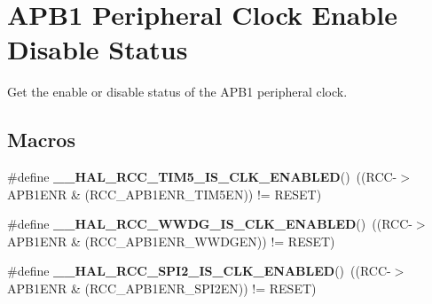 \hypertarget{group___r_c_c___a_p_b1___peripheral___clock___enable___disable___status}{}\section{A\+P\+B1 Peripheral Clock Enable Disable Status}
\label{group___r_c_c___a_p_b1___peripheral___clock___enable___disable___status}


Get the enable or disable status of the A\+P\+B1 peripheral clock.  


\subsection*{Macros}
\begin{DoxyCompactItemize}
\item 
\mbox{\label{group___r_c_c___a_p_b1___peripheral___clock___enable___disable___status_ga76f0a16fed0812fbab8bf15621939c8b}} 
\#define {\bfseries \+\_\+\+\_\+\+H\+A\+L\+\_\+\+R\+C\+C\+\_\+\+T\+I\+M5\+\_\+\+I\+S\+\_\+\+C\+L\+K\+\_\+\+E\+N\+A\+B\+L\+ED}()~((R\+CC-\/$>$A\+P\+B1\+E\+NR \& (R\+C\+C\+\_\+\+A\+P\+B1\+E\+N\+R\+\_\+\+T\+I\+M5\+EN)) != R\+E\+S\+ET)
\item 
\mbox{\label{group___r_c_c___a_p_b1___peripheral___clock___enable___disable___status_ga9b26aff2638d1e0613b0ce0530f0cd48}} 
\#define {\bfseries \+\_\+\+\_\+\+H\+A\+L\+\_\+\+R\+C\+C\+\_\+\+W\+W\+D\+G\+\_\+\+I\+S\+\_\+\+C\+L\+K\+\_\+\+E\+N\+A\+B\+L\+ED}()~((R\+CC-\/$>$A\+P\+B1\+E\+NR \& (R\+C\+C\+\_\+\+A\+P\+B1\+E\+N\+R\+\_\+\+W\+W\+D\+G\+EN)) != R\+E\+S\+ET)
\item 
\mbox{\label{group___r_c_c___a_p_b1___peripheral___clock___enable___disable___status_ga282522dda9557cf715be3ee13c031a5b}} 
\#define {\bfseries \+\_\+\+\_\+\+H\+A\+L\+\_\+\+R\+C\+C\+\_\+\+S\+P\+I2\+\_\+\+I\+S\+\_\+\+C\+L\+K\+\_\+\+E\+N\+A\+B\+L\+ED}()~((R\+CC-\/$>$A\+P\+B1\+E\+NR \& (R\+C\+C\+\_\+\+A\+P\+B1\+E\+N\+R\+\_\+\+S\+P\+I2\+EN)) != R\+E\+S\+ET)
\item 
\mbox{\label{group___r_c_c___a_p_b1___peripheral___clock___enable___disable___status_gad3bbe0639658ed2cc56f8328b26373ea}} 

\end{DoxyCompactItemize}
